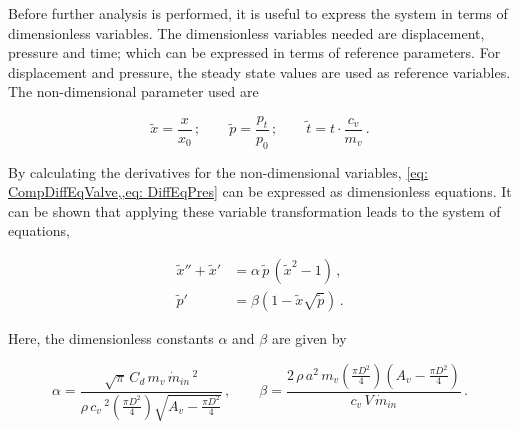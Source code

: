 Before further analysis is performed, it is useful to express the system in terms of dimensionless variables. The dimensionless variables needed are displacement, pressure and time; which can be expressed in terms of reference parameters. For displacement and pressure, the steady state values are used as reference variables. The non-dimensional parameter used are

\begin{equation*}
    \tilde{x} = \frac{x}{x_{0}} \, ; \qquad
    \tilde{p} = \frac{p_t}{p_{0}} \, ; \qquad 
    \tilde{t} = t \cdot \frac{c_v}{m_v} \, .
\end{equation*}



By calculating the derivatives for the non-dimensional variables, \cref{eq: CompDiffEqValve,,eq: DiffEqPres} can be expressed as dimensionless equations. It can be shown that applying these variable transformation leads to the system of equations,

\begin{equation} \label{eq: Non-DimODE}
\begin{split}
    \tilde{x}'' + \tilde{x}' &= \alpha \, \tilde{p} \, \left( \tilde{x}^2 - 1 \right) \, ,\\
    \tilde{p}' &= \beta \left( 1 - \tilde{x} \sqrt{\tilde{p}} \right) \, .
\end{split}
\end{equation}

Here, the dimensionless constants $\alpha$ and $\beta$ are given by

\begin{equation*}
    \alpha = %
    \frac{\sqrt{\pi} \, C_d \, m_v \, \dot{m}_{in}\,^2}{\rho \, c_v\,^2 \left( \frac{\pi D^2}{4} \right) \sqrt{A_v - \frac{\pi D^2}{4}} } \, , %
    \qquad
    \beta = %
    \frac{ 2 \, \rho \, a^2 \, m_v \left( \frac{\pi D^2}{4} \right) \left( A_v - \frac{\pi D^2}{4} \right) }{ c_v \, V \, \dot{m}_{in} } \, .
\end{equation*}

